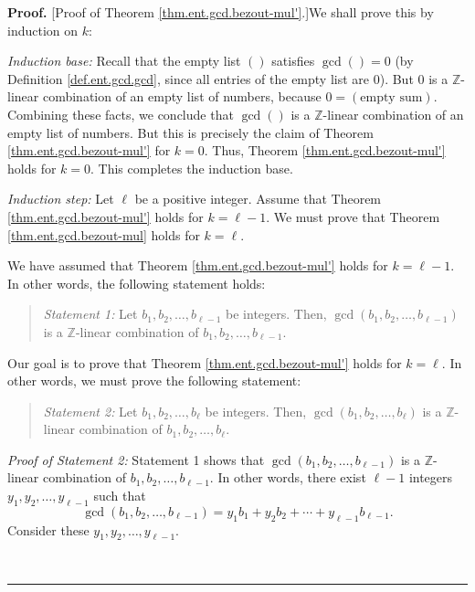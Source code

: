 \documentclass[numbers=enddot,12pt,final,onecolumn,notitlepage]{scrartcl}%
\numberwithin{exer}{subsection}
\theoremstyle{definition}
\newenvironment{statement}{\begin{quote}}{\end{quote}}
\newenvironment{proof}[1][Proof]{\noindent\textbf{#1.} }{\ \rule{0.5em}{0.5em}}
\begin{document}
\begin{proof}
[Proof of Theorem \ref{thm.ent.gcd.bezout-mul'}.]We shall prove this by
induction on $k$:

\textit{Induction base:} Recall that the empty list $\left(  {}\right)  $
satisfies $\gcd\left(  {}\right)  =0$ (by Definition \ref{def.ent.gcd.gcd},
since all entries of the empty list are $0$). But $0$ is a $\mathbb{Z}$-linear
combination of an empty list of numbers, because $0=\left(  \text{empty
sum}\right)  $. Combining these facts, we conclude that $\gcd\left(
{}\right)  $ is a $\mathbb{Z}$-linear combination of an empty list of numbers.
But this is precisely the claim of Theorem \ref{thm.ent.gcd.bezout-mul'} for
$k=0$. Thus, Theorem \ref{thm.ent.gcd.bezout-mul'} holds for $k=0$. This
completes the induction base.

\textit{Induction step:} Let $\ell$ be a positive integer. Assume that Theorem
\ref{thm.ent.gcd.bezout-mul'} holds for $k=\ell-1$. We must prove that Theorem
\ref{thm.ent.gcd.bezout-mul} holds for $k=\ell$.

We have assumed that Theorem \ref{thm.ent.gcd.bezout-mul'} holds for
$k=\ell-1$. In other words, the following statement holds:

\begin{statement}
\textit{Statement 1:} Let $b_{1},b_{2},\ldots,b_{\ell-1}$ be integers. Then,
$\gcd\left(  b_{1},b_{2},\ldots,b_{\ell-1}\right)  $ is a $\mathbb{Z}$-linear
combination of $b_{1},b_{2},\ldots,b_{\ell-1}$.
\end{statement}

Our goal is to prove that Theorem \ref{thm.ent.gcd.bezout-mul'} holds for
$k=\ell$. In other words, we must prove the following statement:

\begin{statement}
\textit{Statement 2:} Let $b_{1},b_{2},\ldots,b_{\ell}$ be integers. Then,
$\gcd\left(  b_{1},b_{2},\ldots,b_{\ell}\right)  $ is a $\mathbb{Z}$-linear
combination of $b_{1},b_{2},\ldots,b_{\ell}$.
\end{statement}

\textit{Proof of Statement 2:} Statement 1 shows that $\gcd\left(  b_{1}%
,b_{2},\ldots,b_{\ell-1}\right)  $ is a $\mathbb{Z}$-linear combination of
$b_{1},b_{2},\ldots,b_{\ell-1}$. In other words, there exist $\ell-1$ integers
$y_{1},y_{2},\ldots,y_{\ell-1}$ such that%
\[
\gcd\left(  b_{1},b_{2},\ldots,b_{\ell-1}\right)  =y_{1}b_{1}+y_{2}%
b_{2}+\cdots+y_{\ell-1}b_{\ell-1}.
\]
Consider these $y_{1},y_{2},\ldots,y_{\ell-1}$.


\end{proof}
\end{document}
